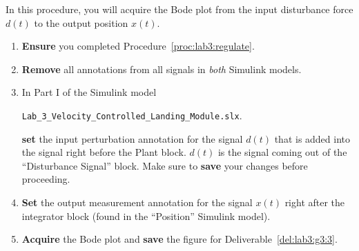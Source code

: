 \begin{procedure}[label={proc:lab3:disturbance}]
  In this procedure, you will acquire the Bode plot from the input disturbance force \(d(t)\) to the output position \(x(t).\)
  \begin{enumerate}[label={(\arabic*)}]
    \item{%
      \textbf{Ensure} you completed Procedure~\ref{proc:lab3:regulate}.
    }
    \item{%
      \textbf{Remove} all annotations from all signals in \emph{both} Simulink models.
    }
    \item{%
      In Part I of the Simulink model
      \begin{center}
        \texttt{Lab\_3\_Velocity\_Controlled\_Landing\_Module.slx}.
      \end{center}
      \textbf{set} the input perturbation annotation for the signal \(d(t)\) that is added into the signal right before the Plant block.
      \(d(t)\) is the signal coming out of the ``Disturbance Signal'' block.
      Make sure to \textbf{save} your changes before proceeding.
    }
    \item{%
      \textbf{Set} the output measurement annotation for the signal \(x(t)\) right after the integrator block (found in the ``Position'' Simulink model).
    }
    \item{%
      \textbf{Acquire} the Bode plot and \textbf{save} the figure for Deliverable~\ref{del:lab3:g3:3}.
    }
  \end{enumerate}
\end{procedure}
%

